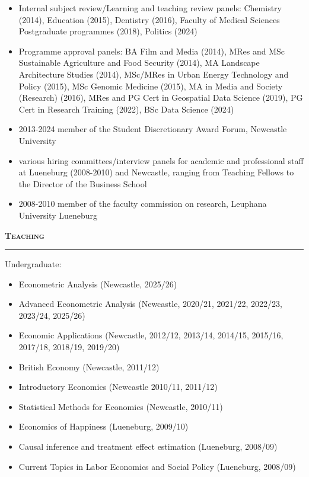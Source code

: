 \documentclass[10pt,pdftex,a4paper,oneside]{article}
\begin{document}
\begin{itemize}[noitemsep,nolistsep]
\item[] Internal subject review/Learning and teaching review panels: Chemistry (2014), Education (2015), Dentistry (2016), Faculty of Medical Sciences Postgraduate programmes (2018), Politics (2024)
\item[] Programme approval panels: BA Film and Media (2014), MRes and MSc Sustainable Agriculture and Food Security (2014), MA Landscape Architecture Studies (2014), MSc/MRes in Urban Energy Technology and Policy (2015), MSc Genomic Medicine (2015), MA in Media and Society (Research) (2016), MRes and PG Cert in Geospatial Data Science (2019), PG Cert in Research Training (2022), BSc Data Science (2024)
\item[] 2013-2024 member of the Student Discretionary Award Forum, Newcastle University
\item[] various hiring committees/interview panels for academic and professional staff at Lueneburg (2008-2010) and Newcastle, ranging from Teaching Fellows to the Director of the Business School
\item[] 2008-2010 member of the faculty commission on research, Leuphana University Lueneburg
\end{itemize}

\textbf{\textsc{Teaching}}
\vspace{.5ex}
\hrule
Undergraduate: 
\begin{itemize}[noitemsep,nolistsep]
	\item Econometric Analysis (Newcastle, 2025/26)
	\item Advanced Econometric Analysis (Newcastle, 2020/21, 2021/22, 2022/23, 2023/24, 2025/26)
	\item Economic Applications (Newcastle, 2012/12, 2013/14, 2014/15, 2015/16, 2017/18, 2018/19, 2019/20)
	\item British Economy (Newcastle, 2011/12)
	\item Introductory Economics (Newcastle 2010/11, 2011/12)
	\item Statistical Methods for Economics (Newcastle, 2010/11)
	\item Economics of Happiness (Lueneburg, 2009/10)
	\item Causal inference and treatment effect estimation (Lueneburg, 2008/09)
	\item Current Topics in Labor Economics and Social Policy (Lueneburg, 2008/09)
\end{itemize}
\end{document}
